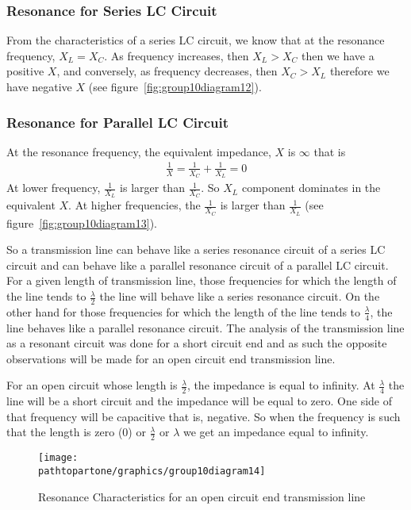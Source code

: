 \subsubsection{Resonance for Series LC Circuit}
From the characteristics of a series LC circuit, we know that at the resonance frequency, $X_L = X_C$. As frequency increases, then $ X_{L} > X_{C} $ then we have a positive $X$, and conversely, as frequency decreases, then $ X_{C} > X_{L} $ therefore we have negative $X$ (see figure~\ref{fig:group10diagram12}).

\subsubsection{Resonance for Parallel LC Circuit}
At the resonance frequency, the equivalent impedance, $X$ is $\infty$ that is
\begin{align*}
	\frac{1}{X} = \frac{1}{X_{C}} + \frac{1}{X_{L}} = 0
\end{align*}
At lower frequency, $ \frac{1}{X_{L}} $ is larger than $ \frac{1}{X_{C}} $. So $ X_{L} $ component dominates in the equivalent $X$. At higher frequencies, the $\frac{1}{X_C}$ is larger than $\frac{1}{X_L}$ (see figure~\ref{fig:group10diagram13}).

So a transmission line can behave like a series resonance circuit of a series LC circuit and can behave like a parallel resonance circuit of a parallel LC circuit. For a given length of transmission line, those frequencies for which the length of the line tends to $ \frac{\lambda}{2} $ the line will behave like a series resonance circuit. On the other hand for those frequencies for which the length of the line tends to $ \frac{\lambda}{4} $, the line behaves like a parallel resonance circuit. The analysis of the transmission line as a resonant circuit was done for a short circuit end and as such the opposite observations will be made for an open circuit end transmission line.

For an open circuit whose length is $ \frac{\lambda}{2} $, the impedance is equal to infinity. At $ \frac{\lambda}{4} $ the line will be a short circuit and the impedance will be equal to zero. One side of that frequency will be capacitive that is, negative. So when the frequency is such that the length is zero (0) or $ \frac{\lambda}{2} $ or $ \lambda$ we get an impedance equal to infinity.
\begin{figure}[ht]
	\centering
	\texttt{[image: \\pathtopartone/graphics/group10diagram14]}
	\caption{Resonance Characteristics for an open circuit end transmission line}
	\label{fig:group10diagram15}
\end{figure}

